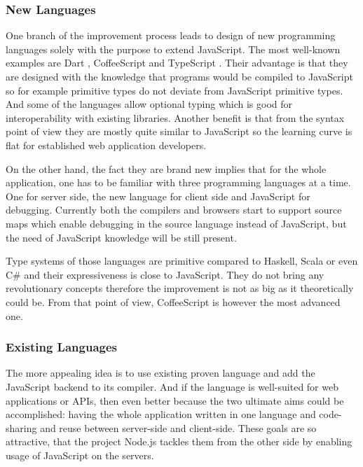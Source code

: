 \documentclass[12pt,a4paper]{report}
\begin{document}
\subsubsection*{New Languages} 

One branch of the improvement process leads to design of new programming languages solely with the purpose to extend JavaScript. The most well-known examples are Dart \cite{Dart}, CoffeeScript \cite{CoffeeScript} and TypeScript \cite{TypeScript}. Their advantage is that they are designed with the knowledge that programs would be compiled to JavaScript so for example primitive types do not deviate from JavaScript primitive types. And some of the languages allow optional typing which is good for interoperability with existing libraries. Another benefit is that from the syntax point of view they are mostly quite similar to JavaScript so the learning curve is flat for established web application developers. 

On the other hand, the fact they are brand new implies that for the whole application, one has to be familiar with three programming languages at a time. One for server side, the new language for client side and JavaScript for debugging. Currently both the compilers and browsers start to support source maps which enable debugging in the source language instead of JavaScript, but the need of JavaScript knowledge will be still present. 

Type systems of those languages are primitive compared to Haskell, Scala or even C\# and their expressiveness is close to JavaScript. They do not bring any revolutionary concepts therefore the improvement is not as big as it theoretically could be. From that point of view, CoffeeScript is however the most advanced one.

\subsubsection*{Existing Languages} 

The more appealing idea is to use existing proven language and add the JavaScript backend to its compiler. And if the language is well-suited for web applications or APIs, then even better because the two ultimate aims could be accomplished: having the whole application written in one language and code-sharing and reuse between server-side and client-side. These goals are so attractive, that the project Node.js \cite{NodeJs} tackles them from the other side by enabling usage of JavaScript on the servers.
\end{document}
